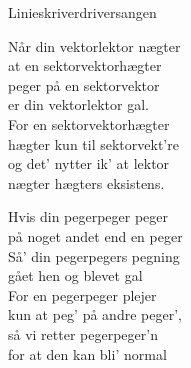 \begin{song}{Linieskriverdriversangen}
  \begin{SBVerse}
    Når din vektorlektor nægter\\
    at en sektorvektorhægter\\
    peger på en sektorvektor\\
    er din vektorlektor gal.\\\medskip
    For en sektorvektorhægter\\
    hægter kun til sektorvekt're\\
    og det' nytter ik' at lektor\\
    nægter hægters eksistens.
  \end{SBVerse}

  \begin{SBVerse}
    Hvis din pegerpeger peger\\
    på noget andet end en peger\\
    Så' din pegerpegers pegning\\
    gået hen og blevet gal\\\medskip
    For en pegerpeger plejer\\
    kun at peg' på andre peger',\\
    så vi retter pegerpeger'n\\
    for at den kan bli' normal
  \end{SBVerse}
\end{song}